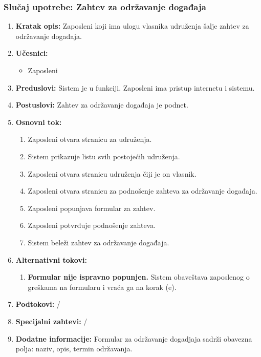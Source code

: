 \documentclass[a4paper]{article}
\begin{document}
\subsubsection{Slučaj upotrebe: Zahtev za održavanje događaja}
\begin{enumerate}
    \item \textbf{Kratak opis:} Zaposleni koji ima ulogu vlasnika udruženja šalje zahtev za održavanje događaja.
    \item \textbf{Učesnici:}
        \begin{itemize}
            \item Zaposleni
        \end{itemize}
    \item \textbf{Preduslovi:} Sistem je u funkciji. Zaposleni ima pristup internetu i sistemu.
    \item \textbf{Postuslovi:} Zahtev za održavanje događaja je podnet.
    \item \textbf{Osnovni tok:}
        \begin{enumerate}
            \item Zaposleni otvara stranicu za udruženja.
            \item Sistem prikazuje listu svih postojećih udruženja.
            \item Zaposleni otvara stranicu udruženja čiji je on vlasnik.
            \item Zaposleni otvara stranicu za podnošenje zahteva za održavanje događaja.
            \item Zaposleni popunjava formular za zahtev.
            \item Zaposleni potvrđuje podnošenje zahteva.
            \item Sistem beleži zahtev za održavanje događaja.
        \end{enumerate}
    \item \textbf{Alternativni tokovi:}
        \begin{enumerate}
            \item \textbf{Formular nije ispravno popunjen.} Sistem obaveštava zaposlenog o greškama na formularu i vraća ga na korak (e).
        \end{enumerate}
    \item \textbf{Podtokovi:} /
    \item \textbf{Specijalni zahtevi:} /
    \item \textbf{Dodatne informacije:} Formular za održavanje dogadjaja sadrži obavezna polja: naziv, opis, termin održavanja.
\end{enumerate}
\end{document}
